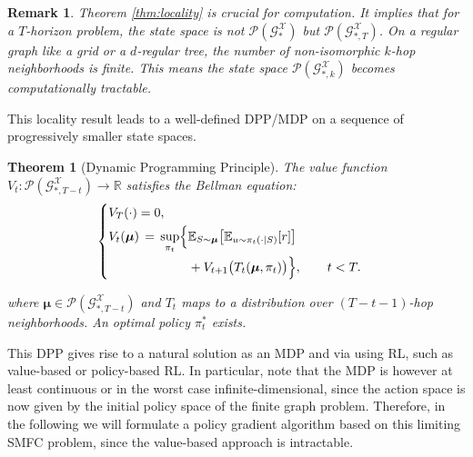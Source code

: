 \documentclass{article}
\newtheorem{remark}{Remark}
\newtheorem{theorem}{Theorem}
\begin{document}
\begin{remark}
Theorem \ref{thm:locality} is crucial for computation. It implies that for a $T$-horizon problem, the state space is not $\mathcal{P}(\mathcal{G}_*^{\mathcal{X}})$ but $\mathcal{P}(\mathcal{G}_{*,T}^{\mathcal{X}})$. On a regular graph like a grid or a $d$-regular tree, the number of non-isomorphic $k$-hop neighborhoods is finite. This means the state space $\mathcal{P}(\mathcal{G}_{*,k}^{\mathcal{X}})$ becomes computationally tractable. 
\end{remark}

This locality result leads to a well-defined DPP/MDP on a sequence of progressively smaller state spaces.

\begin{theorem}[Dynamic Programming Principle] \label{thm:dpp}
The value function $V_t: \mathcal{P}(\mathcal{G}_{*, T-t}^{\mathcal{X}}) \to \mathbb{R}$ satisfies the Bellman equation:
\begin{equation}
\label{equ:dpp}
\begin{cases}
    V_T(\cdot) = 0, \\[0.3em]
    \begin{alignedat}{2}
        V_t(\boldsymbol{\mu})
        &\,=\, \sup_{\pi_t} \Bigl\{
        &&\mathbb{E}_{S \sim \boldsymbol{\mu}}
          \bigl[
            \mathbb{E}_{u \sim \pi_t(\cdot \mid S)}[r]
          \bigr] \\
        &&&+ V_{t+1}\bigl(T_t(\boldsymbol{\mu}, \pi_t)\bigr)
        \Bigr\},
        \qquad t < T .
    \end{alignedat}
\end{cases}
\end{equation}

where $\boldsymbol{\mu} \in \mathcal{P}(\mathcal{G}_{*, T-t}^{\mathcal{X}})$ and $T_t$ maps to a distribution over $(T-t-1)$-hop neighborhoods. An optimal policy $\pi_t^*$ exists.
\end{theorem}

This DPP gives rise to a natural solution as an MDP and via using RL, such as value-based or policy-based RL. In particular, note that the MDP is however at least continuous or in the worst case infinite-dimensional, since the action space is now given by the initial policy space of the finite graph problem. Therefore, in the following we will formulate a policy gradient algorithm based on this limiting SMFC problem, since the value-based approach is intractable.
\end{document}
